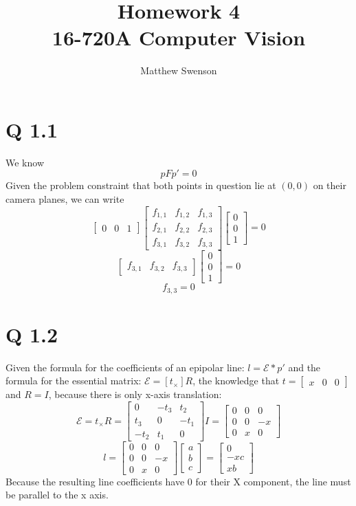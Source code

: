 \documentclass[11pt]{article}
\title{Homework 4\\ \vspace{2mm}\Large{16-720A Computer Vision }}
\author{Matthew Swenson}
\begin{document}
	\maketitle
	
\section*{Q 1.1}
We know 
$$pFp'=0$$
Given the problem constraint that both points in question lie at $(0,0)$ on their camera planes, we can write
$$
\begin{bmatrix}0 &0& 1\end{bmatrix}
\left[\begin{array}{ccc} f_{1,1} & f_{1,2} & f_{1,3}\\ f_{2,1} & f_{2,2} & f_{2,3}\\ f_{3,1} & f_{3,
2} & f_{3,3} \end{array}\right]
\begin{bmatrix}0\\ 0\\ 1\end{bmatrix}
    =
    0
$$
$$
\begin{bmatrix}f_{3,1} &f_{3,2}& f_{3,3}\end{bmatrix}
\begin{bmatrix}0\\ 0\\ 1\end{bmatrix}
    =
    0
$$
$$f_{3,3}  = 0$$

\section*{Q 1.2}
Given the formula for the coefficients of an epipolar line: $l = \mathcal{E}*p'$ and the formula for the essential matrix: $\mathcal{E}=[t_\times]R$, the knowledge
that $t = \begin{bmatrix}x &0& 0\end{bmatrix}$ and $R=I$, because there is only x-axis translation:
$$\mathcal{E}={t_\times}R = 
\begin{bmatrix}0 &-t_3& t_2\\ t_3 & 0& -t_1 \\-t_2 &t_1& 0\end{bmatrix}I =
\begin{bmatrix}0 &0& 0\\ 0& 0&-x \\0 &x& 0\end{bmatrix}
    $$
    $$l=
\begin{bmatrix}0 &0& 0\\ 0& 0&-x \\0 &x& 0\end{bmatrix}
\begin{bmatrix}a\\ b\\ c\end{bmatrix}
    =
\begin{bmatrix}0\\-xc\\ xb\end{bmatrix}
    $$
    Because the resulting line coefficients have 0 for their X component, the line must be parallel to the x axis.
\end{document}
